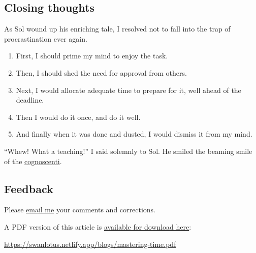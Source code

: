\documentclass[
  a4paper,
]{article}
\providecommand{\tightlist}{%
  \setlength{\itemsep}{0pt}\setlength{\parskip}{0pt}}
\begin{document}
\subsection{Closing thoughts}\label{closing-thoughts}

As Sol wound up his enriching tale, I resolved not to fall into the trap
of procrastination ever again.

\begin{enumerate}
\tightlist
\item
  First, I should prime my mind to enjoy the task.
\item
  Then, I should shed the need for approval from others.
\item
  Next, I would allocate adequate time to prepare for it, well ahead of
  the deadline.
\item
  Then I would do it once, and do it well.
\item
  And finally when it was done and dusted, I would dismiss it from my
  mind.
\end{enumerate}

``Whew! What a teaching!'' I said solemnly to Sol. He smiled the beaming
smile of the
\href{https://www.dictionary.com/browse/cognoscenti}{cognoscenti}.

\subsection{Feedback}\label{feedback}

Please \href{mailto:feedback.swanlotus@gmail.com}{email me} your
comments and corrections.

\noindent A PDF version of this article is
\href{./mastering-time.pdf}{available for download here}:

\begin{small}

\begin{sffamily}

\url{https://swanlotus.netlify.app/blogs/mastering-time.pdf}

\end{sffamily}

\end{small}
\end{document}
